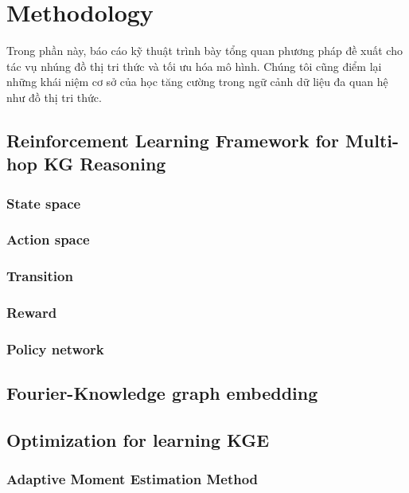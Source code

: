 \section{Methodology}

Trong phần này, báo cáo kỹ thuật trình bày tổng quan phương pháp đề xuất cho tác vụ nhúng đồ thị tri thức và tối ưu hóa mô hình. Chúng tôi cũng điểm lại những khái niệm cơ sở của học tăng cường trong ngữ cảnh dữ liệu đa quan hệ như đồ thị tri thức.

\subsection{Reinforcement Learning Framework for Multi-hop KG Reasoning}

\subsubsection{State space}

\subsubsection{Action space}

\subsubsection{Transition}

\subsubsection{Reward}

\subsubsection{Policy network}

\subsection{Fourier-Knowledge graph embedding}

\subsection{Optimization for learning KGE}

\subsubsection{Adaptive Moment Estimation Method}

